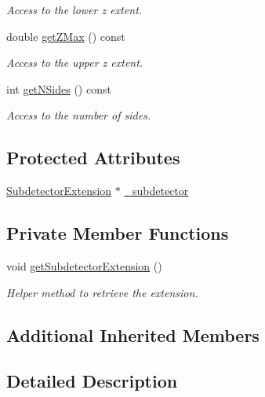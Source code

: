 \begin{DoxyCompactItemize}
\begin{DoxyCompactList}\small\item\em Access to the lower z extent. \end{DoxyCompactList}\item 
double \hyperlink{class_d_d4hep_1_1_d_d_rec_1_1_subdetector_af831a3c2b8fc53dfe2a01e0c39ad2a0e}{get\+Z\+Max} () const
\begin{DoxyCompactList}\small\item\em Access to the upper z extent. \end{DoxyCompactList}\item 
int \hyperlink{class_d_d4hep_1_1_d_d_rec_1_1_subdetector_a10f33f7031e8876e46afc3933c32f545}{get\+N\+Sides} () const
\begin{DoxyCompactList}\small\item\em Access to the number of sides. \end{DoxyCompactList}\end{DoxyCompactItemize}
\subsection*{Protected Attributes}
\begin{DoxyCompactItemize}
\item 
\hyperlink{class_d_d4hep_1_1_d_d_rec_1_1_subdetector_extension}{Subdetector\+Extension} $\ast$ \hyperlink{class_d_d4hep_1_1_d_d_rec_1_1_subdetector_a5caedab984b0c8d6810eae5b85d238b1}{\+\_\+subdetector}
\end{DoxyCompactItemize}
\subsection*{Private Member Functions}
\begin{DoxyCompactItemize}
\item 
void \hyperlink{class_d_d4hep_1_1_d_d_rec_1_1_subdetector_a40f367c23928392476ad5c3f98da8a1a}{get\+Subdetector\+Extension} ()
\begin{DoxyCompactList}\small\item\em Helper method to retrieve the extension. \end{DoxyCompactList}\end{DoxyCompactItemize}
\subsection*{Additional Inherited Members}


\subsection{Detailed Description}


